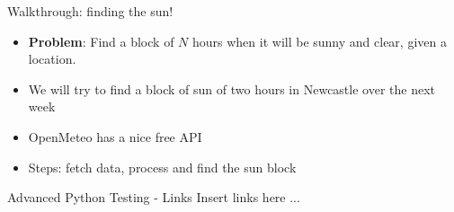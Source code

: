 \documentclass[11pt,xcolor={dvipsnames},hyperref={pdftex,pdfpagemode=UseNone,hidelinks,pdfdisplaydoctitle=true},usepdftitle=false]{beamer}
\begin{document}

\begin{frame}{Walkthrough: finding the sun!}
\label{walkthrough-finding-the-sun}
\begin{itemize}
\item
  \textbf{Problem}: Find a block of $N$ hours when it will be sunny and
  clear, given a location.
\item
  We will try to find a block of sun of two hours in Newcastle over the
  next week
\item
  OpenMeteo has a nice free API
\item
  Steps: fetch data, process and find the sun block
\end{itemize}
\end{frame}

\begin{frame}{Advanced Python Testing - Links}
Insert links here ...
\end{frame}
\end{document}
